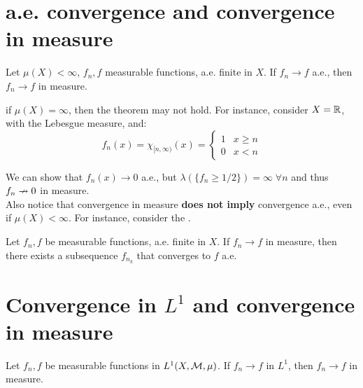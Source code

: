 \section{a.e. convergence and convergence in measure}

\begin{ftheorem}
    Let $\mu(X) < \infty$, $f_n, f$ measurable functions, a.e. finite in $X$.
    If $f_n \to f$ a.e., then $f_n \to f$ in measure.
\end{ftheorem}

\begin{fremark}
    if $\mu(X) = \infty$, then the theorem may not hold. For instance,
    consider $X = \mathbb{R}$, with the Lebesgue measure, and:
    $$f_n(x) = \chi_{[n, \infty)}(x) = \begin{cases}
        1 & x \geq n \\
        0 & x < n
    \end{cases}$$

    We can show that $f_n(x) \to 0$ a.e., but 
    $\lambda(\{f_n \geq 1/2\}) = \infty \; \forall n$ and thus
    $f_n \nrightarrow 0$ in measure.\\

    Also notice that convergence in measure \textbf{does not imply} 
    convergence a.e., even if $\mu(X) < \infty$. For instance, consider
    the \textbf{}.
\end{fremark}

\vspace{1em}

\begin{ftheorem}
    Let $f_n, f$ be measurable functions, a.e. finite in $X$. If $f_n \to f$ in measure,
    then there exists a subsequence $f_{n_k}$ that converges to $f$ a.e.
\end{ftheorem}

\section{Convergence in $L^1$ and convergence in measure}

\begin{ftheorem}
    Let $f_n, f$ be measurable functions in $L^1(X, \mathcal{M}, \mu)$.
    If $f_n \to f$ in $L^1$, then $f_n \to f$ in measure.
\end{ftheorem}

